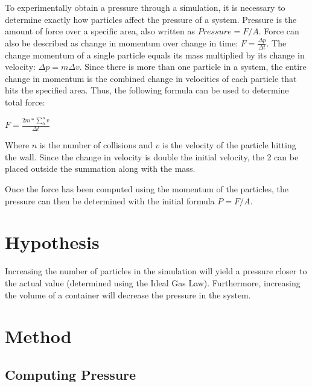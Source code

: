 \documentclass[]{article}
\begin{document}
To experimentally obtain a pressure through a simulation, it is
necessary to determine exactly how particles affect the pressure of a
system. Pressure is the amount of force over a specific area, also
written as $Pressure=F/A$. Force can also be described as change in
momentum over change in time: $F = \frac{\Delta p}{\Delta t}$. The
change momentum of a single particle equals its mass multiplied by its
change in velocity: ${\Delta p} = m\Delta v$. Since there is more than
one particle in a system, the entire change in momentum is the combined
change in velocities of each particle that hits the specified area.
Thus, the following formula can be used to determine total force:

\begin{center}

 $F = \frac{2m * \displaystyle\sum\limits_{0}^n v}{\Delta t}$

 \end{center}

Where $n$ is the number of collisions and $v$ is the velocity of the
particle hitting the wall. Since the change in velocity is double the
initial velocity, the 2 can be placed outside the summation along with
the mass.

Once the force has been computed using the momentum of the particles,
the pressure can then be determined with the initial formula $P = F/A$.

\section{Hypothesis}

Increasing the number of particles in the simulation will yield a
pressure closer to the actual value (determined using the Ideal Gas
Law). Furthermore, increasing the volume of a container will decrease
the pressure in the system.

\section{Method}

\subsection{Computing Pressure}
\end{document}
